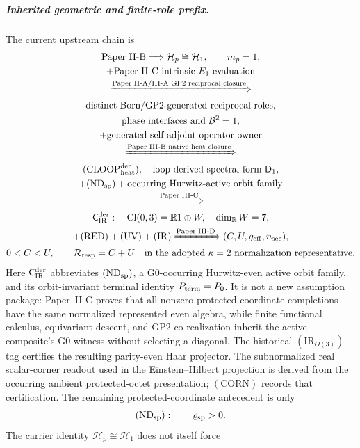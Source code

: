 \documentclass[12pt,a4paper]{article}
\begin{document}
\subparagraph{Inherited geometric and finite-role prefix.}
The current upstream chain is
\[
\begin{gathered}
\text{Paper~II-B}
\Longrightarrow
\mathcal H_p\cong\mathcal H_1,\qquad m_p=1,\\
+\text{Paper-II-C intrinsic }E_1\text{-evaluation}\\[-2pt]
\xRightarrow{\text{Paper~II-A/III-A GP2 reciprocal closure}}\\[-2pt]
\text{distinct Born/GP2-generated reciprocal roles},\\
\text{phase interfaces and }\mathcal B^2=1,\\
+\text{generated self-adjoint operator owner}\\[-2pt]
\xRightarrow{\text{Paper~III-B native heat closure}}\\[-2pt]
(\mathrm{CLOOP}_{\rm heat}^{\rm der}),\quad
\text{loop-derived spectral form }\mathsf{D}_1,\\
+(\mathrm{ND}_{\rm sp})+\text{occurring Hurwitz-active orbit family}\\[-2pt]
\xRightarrow{\text{Paper~III-C}}\\[-2pt]
\mathsf C_{\rm IR}^{\rm der}:\quad
\operatorname{Cl}(0,3)=\mathbb R1\oplus W,\quad \dim_{\mathbb R}W=7,\\
 +({\rm RED})+({\rm UV})+({\rm IR})
\xRightarrow{\text{Paper~III-D}}
(C,U,g_{\rm eff},n_{\rm sec}),\\[-2pt]
0<C<U,\qquad
\mathcal R_{\rm resp}=C+U\quad\text{in the adopted }\kappa=2
\text{ normalization representative}.
\end{gathered}
\]
Here \(\mathsf C_{\rm IR}^{\rm der}\) abbreviates
\((\mathrm{ND}_{\rm sp})\), a G0-occurring Hurwitz-even active orbit family,
and its orbit-invariant terminal identity \(P_{\rm term}=P_0\).  It is not a new
assumption package: Paper~II-C proves that all nonzero protected-coordinate
completions have the same normalized represented even algebra, while finite
functional calculus, equivariant descent, and GP2 co-realization inherit the
active composite's G0 witness without selecting a diagonal.  The historical
\((\mathrm{IR}_{O(3)})\) tag certifies the resulting
parity-even Haar projector.  The subnormalized real scalar-corner readout used
in the Einstein--Hilbert projection is derived from the occurring ambient
protected-octet presentation; \((\mathrm{CORN})\) records that certification.
The remaining protected-coordinate antecedent is only
\[
 (\mathrm{ND}_{\rm sp}):\qquad \varrho_{\rm sp}>0.
\]
The carrier identity \(\mathcal H_p\cong\mathcal H_1\) does not itself force
\end{document}
